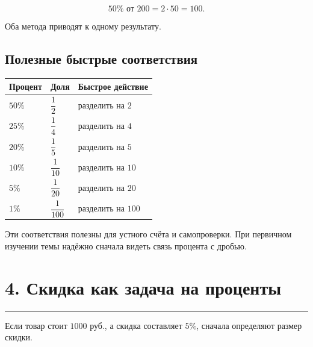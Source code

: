 \documentclass[a4paper,12pt]{article}
\newcommand{\sectionrule}{%
  \par
  \vspace{-0.35em}
  {\color{accent}\rule{\linewidth}{0.7pt}}
  \vspace{0.55em}
}
\begin{document}
\[
50\%\text{ от }200
=
2\cdot50
=
100.
\]

Оба метода приводят к одному результату.


\subsection*{Полезные быстрые соответствия}

\begin{center}

\begin{tabularx}{\linewidth}{
@{}
>{\centering\arraybackslash}X
>{\centering\arraybackslash}X
>{\centering\arraybackslash}X
@{}
}
\toprule
\textbf{Процент}
&
\textbf{Доля}
&
\textbf{Быстрое действие}
\\
\midrule

$50\%$
&
$\dfrac12$
&
разделить на $2$
\\

$25\%$
&
$\dfrac14$
&
разделить на $4$
\\

$20\%$
&
$\dfrac15$
&
разделить на $5$
\\

$10\%$
&
$\dfrac1{10}$
&
разделить на $10$
\\

$5\%$
&
$\dfrac1{20}$
&
разделить на $20$
\\

$1\%$
&
$\dfrac1{100}$
&
разделить на $100$
\\

\bottomrule
\end{tabularx}

\end{center}

Эти соответствия полезны для устного счёта и самопроверки.
При первичном изучении темы надёжно сначала видеть связь
процента с дробью.


\section*{4. Скидка как задача на проценты}
\sectionrule

Если товар стоит $1000$ руб.,
а скидка составляет $5\%$,
сначала определяют размер скидки.
\end{document}
